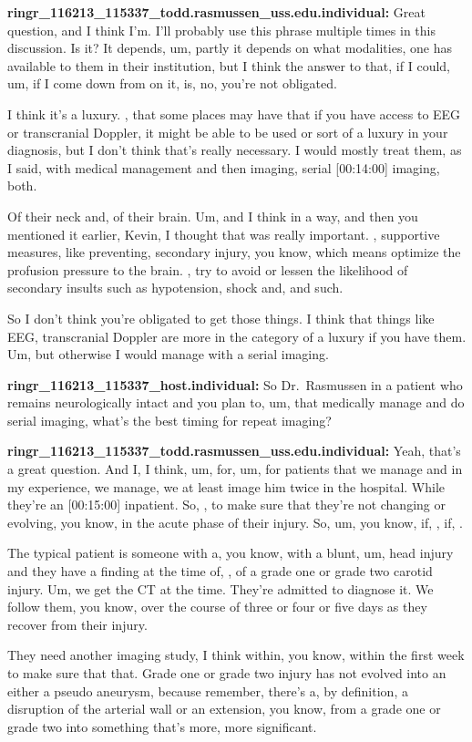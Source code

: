 \documentclass[
]{book}
\begin{document}
\textbf{ringr\_116213\_115337\_todd.rasmussen\_uss.edu.individual:} Great
question, and I think I'm. I'll probably use this phrase multiple times
in this discussion. Is it? It depends, um, partly it depends on what
modalities, one has available to them in their institution, but I think
the answer to that, if I could, um, if I come down from on it, is, no,
you're not obligated.

I think it's a luxury. , that some places may have that if you have
access to EEG or transcranial Doppler, it might be able to be used or
sort of a luxury in your diagnosis, but I don't think that's really
necessary. I would mostly treat them, as I said, with medical management
and then imaging, serial {[}00:14:00{]} imaging, both.

Of their neck and, of their brain. Um, and I think in a way, and then
you mentioned it earlier, Kevin, I thought that was really important. ,
supportive measures, like preventing, secondary injury, you know, which
means optimize the profusion pressure to the brain. , try to avoid or
lessen the likelihood of secondary insults such as hypotension, shock
and, and such.

So I don't think you're obligated to get those things. I think that
things like EEG, transcranial Doppler are more in the category of a
luxury if you have them. Um, but otherwise I would manage with a serial
imaging.

\textbf{ringr\_116213\_115337\_host.individual:} So Dr.~Rasmussen in a patient
who remains neurologically intact and you plan to, um, that medically
manage and do serial imaging, what's the best timing for repeat imaging?

\textbf{ringr\_116213\_115337\_todd.rasmussen\_uss.edu.individual:} Yeah, that's
a great question. And I, I think, um, for, um, for patients that we
manage and in my experience, we manage, we at least image him twice in
the hospital. While they're an {[}00:15:00{]} inpatient. So, , to make sure
that they're not changing or evolving, you know, in the acute phase of
their injury. So, um, you know, if, , if, .

The typical patient is someone with a, you know, with a blunt, um, head
injury and they have a finding at the time of, , of a grade one or grade
two carotid injury. Um, we get the CT at the time. They're admitted to
diagnose it. We follow them, you know, over the course of three or four
or five days as they recover from their injury.

They need another imaging study, I think within, you know, within the
first week to make sure that that. Grade one or grade two injury has not
evolved into an either a pseudo aneurysm, because remember, there's a,
by definition, a disruption of the arterial wall or an extension, you
know, from a grade one or grade two into something that's more, more
significant.
\end{document}
